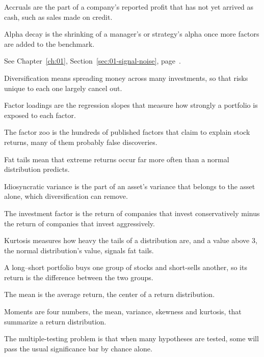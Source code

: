 \begin{keyterms}
\small
\begin{description}[leftmargin=0pt, itemsep=2pt, parsep=0pt, font=\normalfont\bfseries\color{FEMaroon}]
  \item[Accruals.] Accruals are the part of a company's reported profit that has not yet arrived as cash, such as sales made on credit.
  \item[Alpha decay.] Alpha decay is the shrinking of a manager's or strategy's alpha once more factors are added to the benchmark.
  \item[Autocorrelation.] See Chapter~\ref{ch:01}, Section~\ref{sec:01-signal-noise}, page~\pageref{kt:autocorrelated}.
  \item[Diversification.] Diversification means spreading money across many investments, so that risks unique to each one largely cancel out.
  \item[Factor loadings.] Factor loadings are the regression slopes that measure how strongly a portfolio is exposed to each factor.
  \item[Factor zoo.] The factor zoo is the hundreds of published factors that claim to explain stock returns, many of them probably false discoveries.
  \item[Fat tails.] Fat tails mean that extreme returns occur far more often than a normal distribution predicts.
  \item[Idiosyncratic variance.] Idiosyncratic variance is the part of an asset's variance that belongs to the asset alone, which diversification can remove.
  \item[Investment factor.] The investment factor is the return of companies that invest conservatively minus the return of companies that invest aggressively.
  \item[Kurtosis.] Kurtosis measures how heavy the tails of a distribution are, and a value above 3, the normal distribution's value, signals fat tails.
  \item[Long--short portfolio.] A long--short portfolio buys one group of stocks and short-sells another, so its return is the difference between the two groups.
  \item[Mean.] The mean is the average return, the center of a return distribution.
  \item[Moments.] Moments are four numbers, the mean, variance, skewness and kurtosis, that summarize a return distribution.
  \item[Multiple-testing problem.] The multiple-testing problem is that when many hypotheses are tested, some will pass the usual significance bar by chance alone.

\end{description}
\end{keyterms}
